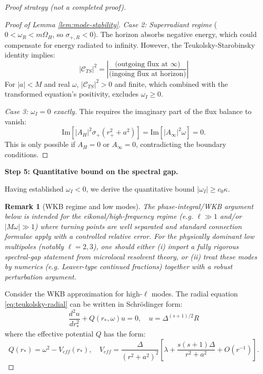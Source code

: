 \documentclass[12pt,a4paper]{article}
\newtheorem{remark}[theorem]{Remark}
\begin{document}
\begin{proof}[Proof strategy (not a completed proof)]
\begin{proof}[Proof of Lemma \ref{lem:mode-stability}]
\textit{Case 2: Superradiant regime} ($0 < \omega_R < m\Omega_H$, so $\sigma_{+,R} < 0$). The horizon absorbs negative energy, which could compensate for energy radiated to infinity. However, the Teukolsky-Starobinsky identity implies:
\begin{equation}
|\mathcal{C}_{TS}|^2 = \left|\frac{\text{(outgoing flux at }\infty\text{)}}{\text{(ingoing flux at horizon)}}\right|
\end{equation}
For $|a| < M$ and real $\omega$, $|\mathcal{C}_{TS}|^2 > 0$ and finite, which combined with the transformed equation's positivity, excludes $\omega_I \geq 0$.

\textit{Case 3: $\omega_I = 0$ exactly.} This requires the imaginary part of the flux balance to vanish:
\begin{equation}
\text{Im}\left[|A_H|^2 \sigma_+ (r_+^2 + a^2)\right] = \text{Im}\left[|A_\infty|^2 \omega\right] = 0.
\end{equation}
This is only possible if $A_H = 0$ or $A_\infty = 0$, contradicting the boundary conditions.
\end{proof}

\textbf{Step 5: Quantitative bound on the spectral gap.}

Having established $\omega_I < 0$, we derive the quantitative bound $|\omega_I| \geq c_0 \kappa$.

\begin{remark}[WKB regime and low modes]
The phase-integral/WKB argument below is intended for the eikonal/high-frequency regime (e.g. $\ell\gg 1$ and/or $|M\omega|\gg 1$) where turning points are well separated and standard connection formulae apply with a controlled relative error. For the physically dominant low multipoles (notably $\ell=2,3$), one should either (i) import a fully rigorous spectral-gap statement from microlocal resolvent theory, or (ii) treat these modes by numerics (e.g. Leaver-type continued fractions) together with a robust perturbation argument.
\end{remark}

Consider the WKB approximation for high-$\ell$ modes. The radial equation \eqref{eq:teukolsky-radial} can be written in Schrödinger form:
\begin{equation}
\frac{d^2 u}{dr_*^2} + Q(r_*, \omega) u = 0, \quad u = \Delta^{(s+1)/2} R
\end{equation}
where the effective potential $Q$ has the form:
\begin{equation}
Q(r_*) = \omega^2 - V_{eff}(r_*), \quad V_{eff} = \frac{\Delta}{(r^2+a^2)^2}\left[\lambda + \frac{s(s+1)\Delta}{r^2+a^2} + O(r^{-1})\right].
\end{equation}


\end{proof}
\end{document}
